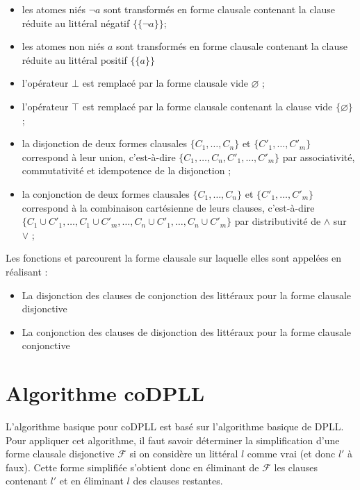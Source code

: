 \documentclass[a4paper, 12pt]{article}
\newcommand{\code}{\commandbox}
\begin{document}
\begin{itemize} 
    \item les atomes niés $\lnot a$ sont transformés en forme clausale contenant la clause réduite au littéral négatif $\{\{\lnot a\}\}$; 
    \item les atomes non niés $a$ sont transformés en forme clausale contenant la clause réduite au littéral positif $\{\{a\}\}$ 
    \item l'opérateur $\bot $ est remplacé par la forme clausale vide $\varnothing $ ; 
    \item l'opérateur $\top $ est remplacé par la forme clausale contenant la clause vide $\{\varnothing\}$ ; 
    \item la disjonction de deux formes clausales $\{C_1, \ldots, C_n\}$ et $\{C'_1, \ldots, C'_m\}$ correspond à leur union, c'est-à-dire $\{C_1, \ldots, C_n, C'_1, \ldots, C'_m\}$ par associativité, commutativité et idempotence de la disjonction ; 
    \item la conjonction de deux formes clausales $\{C_1, \ldots, C_n\}$ et $\{C'_1, \ldots, C'_m\}$ correspond à la combinaison cartésienne de leurs clauses, c'est-à-dire
    $\{C_1 \cup C'_1, \ldots, C_1 \cup C'_m, \ldots, C_n \cup C'_1, \ldots, C_n \cup C'_m\}$ 
    par distributivité de $\land$ sur $\lor$ ; \end{itemize}

\vspace{5mm}

Les fonctions \code{fcd_to_formule} et \code{fcc_to_formule} parcourent la forme clausale sur laquelle elles sont appelées en réalisant :

\begin{itemize} \item La disjonction des clauses de conjonction des littéraux pour la forme clausale disjonctive \item La conjonction des clauses de disjonction des littéraux pour la forme clausale conjonctive \end{itemize}

\section{Algorithme coDPLL}

L'algorithme basique pour coDPLL est basé sur l'algorithme basique de DPLL. Pour appliquer cet algorithme, il faut savoir déterminer la simplification d'une forme clausale disjonctive $\mathcal{F} $ si on considère un littéral $l$ comme vrai (et donc $l'$ à faux). Cette forme simplifiée s'obtient donc en éliminant de $\mathcal{F} $ les clauses contenant $l'$ et en éliminant $l$ des clauses restantes.
\end{document}
